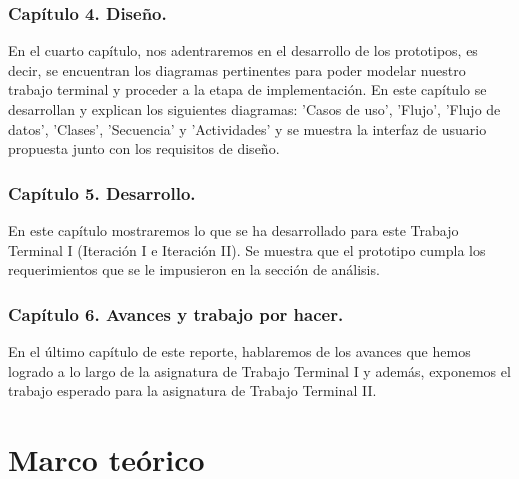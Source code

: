\documentclass[12pt, a4paper, titlepage]{report}
\begin{document}
            \subsection{Capítulo 4. Diseño.}
                En el cuarto capítulo, nos adentraremos en el desarrollo de los prototipos, es decir, se encuentran los diagramas pertinentes para poder modelar nuestro trabajo terminal y proceder a la etapa de implementación. En este capítulo se desarrollan y explican los siguientes diagramas: 'Casos de uso', 'Flujo', 'Flujo de datos', 'Clases', 'Secuencia' y 'Actividades' y se muestra la interfaz de usuario propuesta junto con los requisitos de diseño.
                
            \subsection{Capítulo 5. Desarrollo.}
                En este capítulo mostraremos lo que se ha desarrollado para este Trabajo Terminal I (Iteración I e Iteración II). Se muestra que el prototipo cumpla los requerimientos que se le impusieron en la sección de análisis.
            
            \subsection{Capítulo 6. Avances y trabajo por hacer.}
                En el último capítulo de este reporte, hablaremos de los avances que hemos logrado a lo largo de la asignatura de Trabajo Terminal I y además, exponemos el trabajo esperado para la asignatura de Trabajo Terminal II.
                
    
	\chapter{\textcolor{azulescom}{Marco teórico}}
\end{document}
